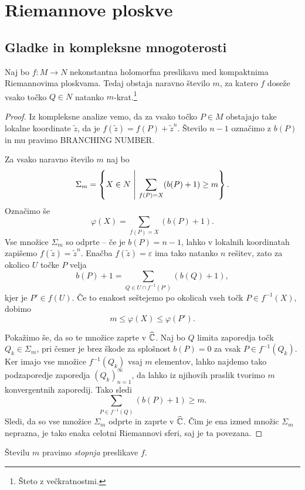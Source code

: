 \section{Riemannove ploskve}

\subsection{Gladke in kompleksne mnogoterosti}


\begin{trditev}
\label{td:deg}
Naj bo $f \colon M \to N$ nekonstantna holomorfna preslikava med
kompaktnima Riemannovima ploskvama. Tedaj obstaja naravno število
$m$, za katero $f$ doseže vsako točko $Q \in N$ natanko
$m$-krat.\footnote{Šteto z večkratnostmi.}
\end{trditev}

\begin{proof}
Iz kompleksne analize vemo, da za vsako točko $P \in M$ obstajajo
take lokalne koordinate $\tilde{z}$, da je
$f(\tilde{z}) = f(P) + \tilde{z}^n$. Število $n-1$ označimo z
$b(P)$ in mu pravimo BRANCHING NUMBER.

Za vsako naravno število $m$ naj bo
\[
\Sigma_m =
\left\{X \in N~\middle\vert~\sum_{f(P)=X} (b(P)+1) \geq m\right\}.
\]
Označimo še
\[
\varphi(X) = \sum_{f(P) = X} (b(P)+1).
\]
Vse množice $\Sigma_m$ so odprte -- če je $b(P) = n-1$, lahko v
lokalnih koordinatah zapišemo $f(\tilde{z}) = \tilde{z}^n$. Enačba
$f(\tilde{z}) = \varepsilon$ ima tako natanko $n$ rešitev, zato za
okolico $U$ točke $P$ velja
\[
b(P) + 1 = \sum_{Q \in U \cap f^{-1}(P')} (b(Q) + 1),
\]
kjer je $P' \in f(U)$. Če to enakost seštejemo po okolicah vseh točk $P \in f^{-1}(X)$, dobimo
\[
m \leq \varphi(X) \leq \varphi(P').
\]

Pokažimo še, da so te množice zaprte v $\widehat{\mathbb{C}}$. Naj bo $Q$ limita
zaporedja točk $Q_k \in \Sigma_m$, pri čemer je brez škode za
splošnost $b(P) = 0$ za vsak $P \in f^{-1}(Q_k)$. Ker imajo vse
množice $f^{-1}(Q_k)$ vsaj $m$ elementov, lahko najdemo tako
podzaporedje zaporedja $(Q_k)_{n=1}^\infty$, da lahko iz njihovih
praslik tvorimo $m$ konvergentnih zaporedij. Tako sledi
\[
\sum_{P \in f^{-1}(Q)} (b(P)+1) \geq m.
\]
Sledi, da so vse množice $\Sigma_m$ odprte in zaprte v $\widehat{\mathbb{C}}$. Čim
je ena izmed množic $\Sigma_m$ neprazna, je tako enaka celotni
Riemannovi sferi, saj je ta povezana.
\end{proof}

Številu $m$ pravimo \emph{stopnja} preslikave $f$.

